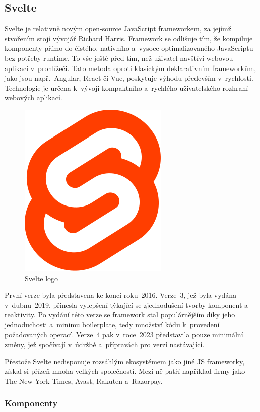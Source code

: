 \subsection{Svelte}

Svelte je relativně novým open-source JavaScript frameworkem, za jejímž stvořením stojí vývojář Richard Harris. 
Framework se odlišuje tím, že kompiluje komponenty přímo do čistého, nativního a~vysoce optimalizovaného JavaScriptu bez potřeby runtime. 
To vše ještě před tím, než uživatel navštíví webovou aplikaci v~prohlížeči. 
Tato metoda oproti klasickým deklarativním frameworkům, jako jsou např.~Angular, React či Vue, poskytuje výhodu především v~rychlosti. 
Technologie je určena k~vývoji kompaktního a~rychlého uživatelského rozhraní webových aplikací.\cite{sveltemdn,svelte,sveltedevinterface}

\begin{figure}[htb]
	\centering
		\includegraphics[width=.18\textwidth]{images/svelte-logo.png}
	\caption[Svelte logo]{Svelte logo \cite{svelte}}
	\label{fig:sveltelogo}
\end{figure}

První verze byla představena ke konci roku~2016. Verze~3, jež byla vydána v~dubnu~2019, přinesla vylepšení týkající se zjednodušení tvorby komponent a reaktivity. 
Po vydání této verze se framework stal populárnějším díky jeho jednoduchosti a~minimu boilerplate, tedy množství kódu k~provedení požadovaných operací. 
Verze~4 pak v~roce~2023 představila pouze minimální změny, jež spočívají v~údržbě a~přípravách pro verzi nastávající.

Přestože Svelte nedisponuje rozsáhlým ekosystémem jako jiné JS frameworky, získal si přízeň mnoha velkých společností. 
Mezi ně patří například firmy jako The New York Times, Avast, Rakuten a~Razorpay.\cite{sveltemdn,svelte,sveltedevinterface}

\subsubsection{Komponenty}


